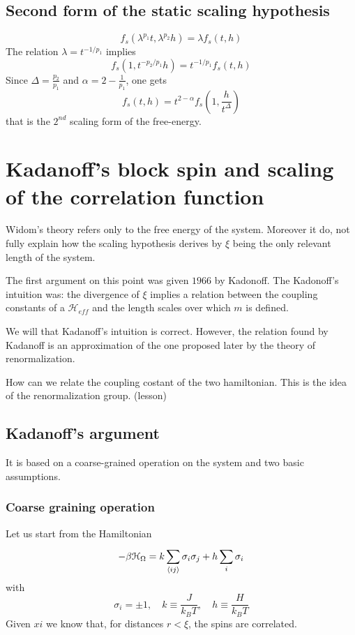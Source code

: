 \documentclass[../main/main.tex]{subfiles}
\begin{document}
\subsection{Second form of the static scaling hypothesis}
\begin{equation}
  f_s ( \lambda^{p_1} t, \lambda ^{p_2}h) = \lambda f_s (t,h)
\end{equation}
The relation \( \lambda = t ^{-1/p_1} \) implies
\begin{equation}
  f_s (1,t^{-p_2/p_1}h) = t^{-1/p_1} f_s (t,h)
\end{equation}
Since \( \Delta = \frac{p_2}{p_1} \) and \( \alpha = 2 - \frac{1}{p_1} \), one gets
\begin{equation}
  f_s (t,h) = t^{2- \alpha } f_s (1, \frac{h}{t^{\Delta }})
\end{equation}
that is the \( 2^{nd} \) scaling form of the free-energy.

\section{Kadanoff's block spin and scaling of the correlation function}
Widom's theory refers only to the free energy of the system. Moreover it do, not fully explain how the scaling hypothesis derives by \( \xi  \) being the only relevant length of the system.

The first argument on this point was given \( 1966 \) by Kadonoff.
The Kadonoff's intuition was: the divergence of \( \xi  \) implies a relation between the coupling constants of a \( \mathcal{H}_{eff} \) and the length scales over which \( m \) is defined.

We will that Kadanoff's intuition is correct. However, the relation found by Kadanoff is an approximation of the one proposed later by the theory of renormalization.
\begin{remark}
How can we relate the coupling costant of the two hamiltonian. This is the idea of the renormalization group. (lesson)
\end{remark}
\subsection{Kadanoff's argument}
It is based on a coarse-grained operation on the system and two basic assumptions.
\subsubsection{Coarse graining operation}
Let us start from the Hamiltonian
\begin{equation}
  - \beta \mathcal{H}_{\Omega } = k \sum_{\expval{ij} }^{} \sigma _i \sigma _j + h \sum_{i}^{} \sigma _i
\end{equation}
with
\begin{equation}
  \sigma _i = \pm 1, \quad k \equiv \frac{J}{k_B T}, \quad h \equiv \frac{H}{k_B T}
\end{equation}
Given \( xi \) we know that, for distances \( r < \xi  \), the spins are correlated.
\end{document}
